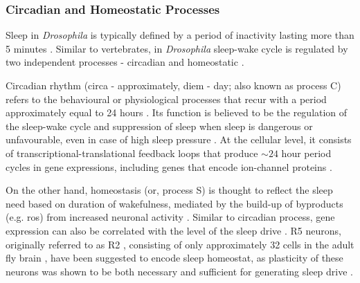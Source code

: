 \documentclass[../main.tex]{subfiles}
\begin{document}
\subsubsection{Circadian and Homeostatic Processes}

Sleep in \textit{Drosophila} is typically defined by a period of inactivity lasting more than 5 minutes \cite{dubowyCircadianRhythmsSleep2017,shaferRegulationDrosophilaSleep2021}. Similar to vertebrates, in \textit{Drosophila} sleep-wake cycle is regulated by two independent processes - circadian and homeostatic \cite{doppSinglecellTranscriptomicsReveals2024,liuSleepDriveEncoded2016}.

Circadian rhythm (circa - approximately, diem - day; also known as process C) refers to the behavioural or physiological processes that recur with a period approximately equal to 24 hours \cite{fernandez-chiappeHighFrequencyNeuronalBursting2021,dubowyCircadianRhythmsSleep2017}. Its function is believed to be the regulation of the sleep-wake cycle and suppression of sleep when sleep is dangerous or unfavourable, even in case of high sleep pressure \cite{shaferRegulationDrosophilaSleep2021,andreaniCircadianProgrammingEllipsoid2022}.
At the cellular level, it consists of transcriptional-translational feedback loops that produce $\sim 24$ hour period cycles in gene expressions, including genes that encode ion-channel proteins
\cite{doppSinglecellTranscriptomicsReveals2024,dubowyCircadianRhythmsSleep2017,andreaniCircadianProgrammingEllipsoid2022}.

On the other hand, homeostasis (or, process S) is thought to reflect the sleep need based on duration of wakefulness, mediated by the build-up of byproducts (e.g. \gls{ros}) from increased neuronal activity
\cite{suarez-grimaltNeuralArchitectureSleep2021,doppSinglecellTranscriptomicsReveals2024,andreaniCircadianProgrammingEllipsoid2022,schmutzSpecificRoleREVERBaControlled2014}. Similar to circadian process, gene expression can also be correlated with the level of the sleep drive \cite{liuSleepDriveEncoded2016}.
R5 neurons, originally referred to as R2 \cite{shaferRegulationDrosophilaSleep2021,liuSleepDriveEncoded2016,donleaRecurrentCircuitryBalancing2018},
consisting of only approximately 32 cells in the adult fly brain \cite{doppSinglecellTranscriptomicsReveals2024}, have been suggested to encode sleep homeostat, as plasticity of these neurons was shown to be both necessary and sufficient for generating sleep drive \cite{liuSleepDriveEncoded2016,doppSinglecellTranscriptomicsReveals2024}.
\end{document}
